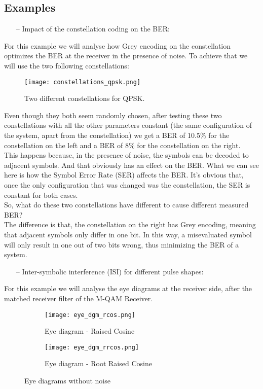 \subsection*{Examples}
\begin{itemize}
  \item[--] Impact of the constellation coding on the BER:
\end{itemize}
  For this example we will analyse how Grey encoding on the constellation optimizes the BER at the receiver in the presence of noise.
  To achieve that we will use the two following constellations:
    \begin{figure}[H]
    	\centering \texttt{[image: constellations\_qpsk.png]}
    	\caption{Two different constellations for QPSK.}\label{QPSK_Constellations}
    \end{figure}
  Even though they both seem randomly chosen, after testing these two constellations with all the other parameters constant (the same configuration of the system, apart from the constellation) we get a BER of 10.5\% for the constellation on the left and a BER of 8\% for the constellation on the right.\\
  This happens because, in the presence of noise, the symbols can be decoded to adjacent symbols. And that obviously has an effect on the BER. What we can see here is how the Symbol Error Rate (SER) affects the BER. It's obvious that, once the only configuration that was changed was the constellation, the SER is constant for both cases. \\
  So, what do these two constellations have different to cause different measured BER?\\
  The difference is that, the constellation on the right has Grey encoding, meaning that adjacent symbols only differ in one bit. In this way, a misevaluated symbol will only result in one out of two bits wrong, thus minimizing the BER of a system.
\begin{itemize}
  \item[--] Inter-symbolic interference (ISI) for different pulse shapes:
\end{itemize}
For this example we will analyse the eye diagrams at the receiver side, after the matched receiver filter of the M-QAM Receiver.
\begin{figure}[H]
	\centering
        \begin{subfigure}{.55\textwidth}
        \centering
        	\texttt{[image: eye\_dgm\_rcos.png]}
            \caption{Eye diagram - Raised Cosine}
            \label{r_cos}
        \end{subfigure}%
        \begin{subfigure}{.55\textwidth}
        \centering
        	\texttt{[image: eye\_dgm\_rrcos.png]}
        	\caption{Eye diagram - Root Raised Cosine}
            \label{rrcos}
        \end{subfigure}
        \caption{Eye diagrams without noise}%
\end{figure}
